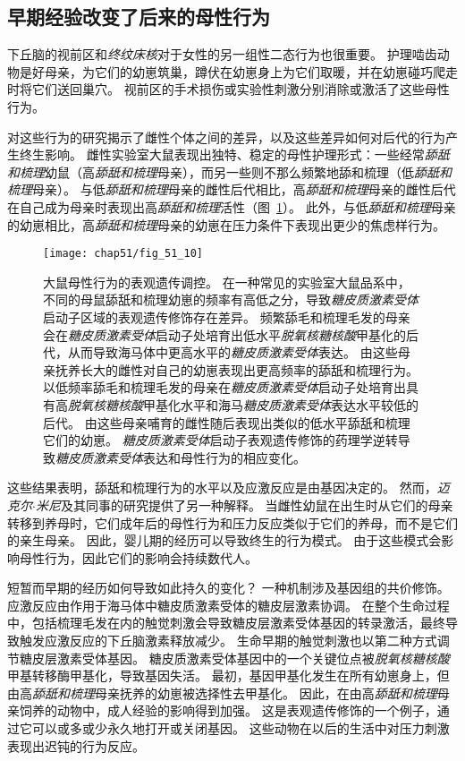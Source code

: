 \subsection{早期经验改变了后来的母性行为}

下丘脑的视前区和\textit{终纹床核}对于女性的另一组性二态行为也很重要。
护理啮齿动物是好母亲，为它们的幼崽筑巢，蹲伏在幼崽身上为它们取暖，并在幼崽碰巧爬走时将它们送回巢穴。
视前区的手术损伤或实验性刺激分别消除或激活了这些母性行为。


对这些行为的研究揭示了雌性个体之间的差异，以及这些差异如何对后代的行为产生终生影响。
雌性实验室大鼠表现出独特、稳定的母性护理形式：一些经常\textit{舔舐和梳理}幼鼠（高\textit{舔舐和梳理}母亲），而另一些则不那么频繁地舔和梳理（低\textit{舔舐和梳理}母亲）。
与低\textit{舔舐和梳理}母亲的雌性后代相比，高\textit{舔舐和梳理}母亲的雌性后代在自己成为母亲时表现出高\textit{舔舐和梳理}活性（图~\ref{fig:51_10}）。
此外，与低\textit{舔舐和梳理}母亲的幼崽相比，高\textit{舔舐和梳理}母亲的幼崽在压力条件下表现出更少的焦虑样行为。


\begin{figure}[htbp]
	\centering
	\texttt{[image: chap51/fig\_51\_10]}
	\caption{大鼠母性行为的表观遗传调控。
		在一种常见的实验室大鼠品系中，不同的母鼠舔舐和梳理幼崽的频率有高低之分，导致\textit{糖皮质激素受体}启动子区域的表观遗传修饰存在差异。
		频繁舔毛和梳理毛发的母亲会在\textit{糖皮质激素受体}启动子处培育出低水平\textit{脱氧核糖核酸}甲基化的后代，从而导致海马体中更高水平的\textit{糖皮质激素受体}表达。
		由这些母亲抚养长大的雌性对自己的幼崽表现出更高频率的舔舐和梳理行为。
		以低频率舔毛和梳理毛发的母亲在\textit{糖皮质激素受体}启动子处培育出具有高\textit{脱氧核糖核酸}甲基化水平和海马\textit{糖皮质激素受体}表达水平较低的后代。
		由这些母亲哺育的雌性随后表现出类似的低水平舔舐和梳理它们的幼崽。
		\textit{糖皮质激素受体}启动子表观遗传修饰的药理学逆转导致\textit{糖皮质激素受体}表达和母性行为的相应变化\cite{sapolsky2004mothering}。}
	\label{fig:51_10}
\end{figure}


这些结果表明，舔舐和梳理行为的水平以及应激反应是由基因决定的。
然而，\textit{迈克尔$\cdot$米尼}及其同事的研究提供了另一种解释。
当雌性幼鼠在出生时从它们的母亲转移到养母时，它们成年后的母性行为和压力反应类似于它们的养母，而不是它们的亲生母亲。
因此，婴儿期的经历可以导致终生的行为模式。
由于这些模式会影响母性行为，因此它们的影响会持续数代人。


短暂而早期的经历如何导致如此持久的变化？
一种机制涉及基因组的共价修饰。
应激反应由作用于海马体中糖皮质激素受体的糖皮层激素协调。
在整个生命过程中，包括梳理毛发在内的触觉刺激会导致糖皮层激素受体基因的转录激活，最终导致触发应激反应的下丘脑激素释放减少。
生命早期的触觉刺激也以第二种方式调节糖皮层激素受体基因。
糖皮质激素受体基因中的一个关键位点被\textit{脱氧核糖核酸}甲基转移酶甲基化，导致基因失活。
最初，基因甲基化发生在所有幼崽身上，但由高\textit{舔舐和梳理}母亲抚养的幼崽被选择性去甲基化。
因此，在由高\textit{舔舐和梳理}母亲饲养的动物中，成人经验的影响得到加强。
这是表观遗传修饰的一个例子，通过它可以或多或少永久地打开或关闭基因。
这些动物在以后的生活中对压力刺激表现出迟钝的行为反应。


